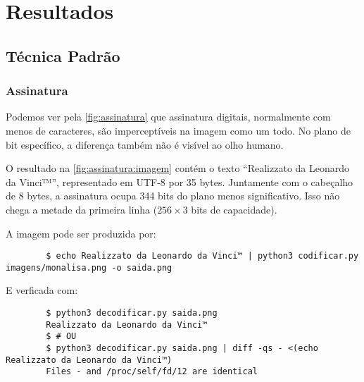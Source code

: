 \section{Resultados}

%
%
%

\subsection{Técnica Padrão}

\subsubsection{Assinatura}

    Podemos ver pela \cref{fig:assinatura} que assinatura digitais, normalmente com menos de caracteres, são imperceptíveis na imagem como um todo. No plano de bit específico, a diferença também não é visível ao olho humano.

    O resultado na \cref{fig:assinatura:imagem} contém o texto ``Realizzato da Leonardo da Vinci™'', representado em UTF-8 por 35 bytes. Juntamente com o cabeçalho de 8 bytes, a assinatura ocupa 344 bits do plano menos significativo. Isso não chega a metade da primeira linha ($256 \times 3$ bits de capacidade).

    A imagem pode ser produzida por:

    \begin{verbatim}
        $ echo Realizzato da Leonardo da Vinci™ | python3 codificar.py imagens/monalisa.png -o saida.png
    \end{verbatim}

    E verficada com:

    \begin{verbatim}
        $ python3 decodificar.py saida.png
        Realizzato da Leonardo da Vinci™
        $ # OU
        $ python3 decodificar.py saida.png | diff -qs - <(echo Realizzato da Leonardo da Vinci™)
        Files - and /proc/self/fd/12 are identical
    \end{verbatim}

    
